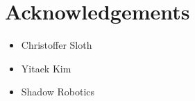 \section*{Acknowledgements}

\begin{itemize}
	\item Christoffer Sloth
	\item Yitaek Kim
	\item Shadow Robotics
\end{itemize}